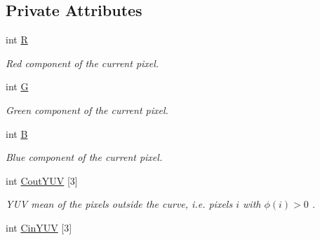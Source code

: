 \subsection*{Private Attributes}
\begin{DoxyCompactItemize}
\item 
\hypertarget{classofeli_1_1_a_cwithout_edges_y_u_v_a2590133637eb415a75ba848efb3d15d0}{int \hyperlink{classofeli_1_1_a_cwithout_edges_y_u_v_a2590133637eb415a75ba848efb3d15d0}{R}}\label{classofeli_1_1_a_cwithout_edges_y_u_v_a2590133637eb415a75ba848efb3d15d0}

\begin{DoxyCompactList}\small\item\em Red component of the current pixel. \end{DoxyCompactList}\item 
\hypertarget{classofeli_1_1_a_cwithout_edges_y_u_v_a39d9c82c2cebebd133d9aaa4faa2eef0}{int \hyperlink{classofeli_1_1_a_cwithout_edges_y_u_v_a39d9c82c2cebebd133d9aaa4faa2eef0}{G}}\label{classofeli_1_1_a_cwithout_edges_y_u_v_a39d9c82c2cebebd133d9aaa4faa2eef0}

\begin{DoxyCompactList}\small\item\em Green component of the current pixel. \end{DoxyCompactList}\item 
\hypertarget{classofeli_1_1_a_cwithout_edges_y_u_v_af11928f0c101c0487b497b4249e5d5e4}{int \hyperlink{classofeli_1_1_a_cwithout_edges_y_u_v_af11928f0c101c0487b497b4249e5d5e4}{B}}\label{classofeli_1_1_a_cwithout_edges_y_u_v_af11928f0c101c0487b497b4249e5d5e4}

\begin{DoxyCompactList}\small\item\em Blue component of the current pixel. \end{DoxyCompactList}\item 
\hypertarget{classofeli_1_1_a_cwithout_edges_y_u_v_a1aea515bf36ea9f426cc653802252ce5}{int \hyperlink{classofeli_1_1_a_cwithout_edges_y_u_v_a1aea515bf36ea9f426cc653802252ce5}{Cout\-Y\-U\-V} \mbox{[}3\mbox{]}}\label{classofeli_1_1_a_cwithout_edges_y_u_v_a1aea515bf36ea9f426cc653802252ce5}

\begin{DoxyCompactList}\small\item\em Y\-U\-V mean of the pixels outside the curve, i.\-e. pixels $i$ with $\phi \left( i\right) >0$ . \end{DoxyCompactList}\item 
\hypertarget{classofeli_1_1_a_cwithout_edges_y_u_v_ac5976def2629d484df763de752bb165d}{int \hyperlink{classofeli_1_1_a_cwithout_edges_y_u_v_ac5976def2629d484df763de752bb165d}{Cin\-Y\-U\-V} \mbox{[}3\mbox{]}}\label{classofeli_1_1_a_cwithout_edges_y_u_v_ac5976def2629d484df763de752bb165d}


\end{DoxyCompactItemize}
